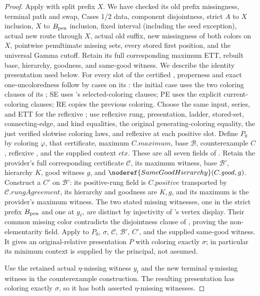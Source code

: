 \begin{proof}
Apply  with split prefix $X$.
We have checked its old prefix missingness, terminal path and swap,
Cases 1/2 data, component disjointness, strict $A$ to $X$ inclusion,
$X$ to $B_{\rm pen}$ inclusion, fixed interval (including the seed
exception), actual new route through $X$, actual old suffix, new
missingness of both colors on $X$, pointwise penultimate missing sets,
every stored first position, and the universal Gamma cutoff.
Retain its full corresponding maximum ETT, rebuilt base, hierarchy,
goodness, and same-good witness.
We describe the identity presentation used below. For every slot of
the certified , properness and exact
one-uncoloredness follow by cases on its
: the initial case uses the two coloring
clauses of its ; SE uses
's selected-coloring clauses; PE uses
the explicit current-coloring clauses; RE copies the previous coloring.
Choose the same input, series, and ETT for the reflexive
; use reflexive rung,
presentation, ladder, stored-set, connecting-edge, and kind equalities,
the original generating-coloring equality, the just verified slotwise
coloring laws, and reflexive  at each positive
slot. Define $P_0$ by coloring $\varphi$, that certificate, maximum
$C.\mathit{maximum}$, base $\mathcal B$, counterexample $C$, reflexive
, and the supplied context $\mathit{ctx}$.
These are all seven fields of
.
Retain the provider's full corresponding certificate $\mathcal C$,
its maximum witness, base $\mathcal B'$, hierarchy $K$, good witness
$g$, and $\noderef{SameGoodHierarchy}(C.\mathit{good},g)$.
Construct a  $C'$ on $\mathcal B'$:
its positive-rung field is $C.\mathit{positive}$ transported by
$\mathcal C.\mathit{rungAgreement}$, its hierarchy and goodness are
$K,g$, and its maximum is the provider's maximum witness.
The two stated missing witnesses, one in the strict prefix
$B_{\rm pen}$ and one at $y_\ell$, are distinct by injectivity of
's vertex display. Their common missing color
contradicts the disjointness clause of
, proving the non-elementarity
field. Apply  to $P_0$,
$\sigma$, $\mathcal C$, $\mathcal B'$, $C'$, and the supplied same-good
witness. It gives an original-relative presentation $P$ with coloring
exactly $\sigma$; in particular its minimum context is supplied by the
principal, not assumed.


Use the retained actual $\eta$-missing witness $y_t$ and the new
terminal $\eta$-missing witness in the counterexample construction.
The resulting presentation has coloring exactly $\sigma$, so it
has both asserted $\eta$-missing witnesses.
\end{proof}
